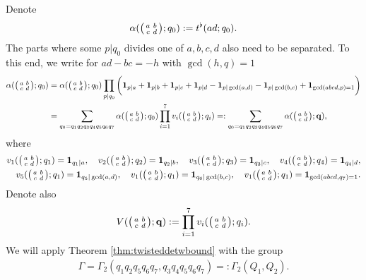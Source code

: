 \documentclass[12pt]{amsart}
\theoremstyle{definition}
\theoremstyle{remark}
\numberwithin{equation}{section}
\newcommand{\1}{{\mathbf 1}}
\renewcommand{\c}{\mathfrak c}
\begin{document}
Denote
\begin{align*}
    \alpha(\smqty(a & b \\c & d);q_0) := t^{\flat}(ad;q_0).
\end{align*}
The parts where some $p|q_0$ divides one of $a,b,c,d$ also need to be separated. To this end, we write for $ad-bc=-h$ with $\gcd(h,q)=1$
\begin{align}
  \nonumber   \alpha(\smqty(a & b \\c & d);q_0) &=  \alpha(\smqty(a & b \\c & d);q_0) \prod_{p|q_0} \bigg( \mathbf{1}_{p|a}+\mathbf{1}_{p|b} +  \mathbf{1}_{\substack{p|c  }}   + \mathbf{1}_{\substack{p |d  }} -\mathbf{1}_{p|\gcd(a,d)} -\mathbf{1}_{p|\gcd(b,c)}+ \mathbf{1}_{ \gcd(abcd,p)=1 }\bigg) \\
\label{eq:alphaqxdef}     &= \sum_{q_0=q_{1} q_{2} q_{3}q_{4}q_5 q_6 q_7}   \alpha(\smqty(a & b \\c & d);q_0) \prod_{i=1}^7 v_i(\smqty(a & b \\c & d);q_i)=: \sum_{q_0=q_{1} q_{2} q_{3}q_{4}q_5 q_6 q_7} \alpha(\smqty(a & b \\c & d);\mathbf{q}),
\end{align}
where
\begin{align*}
    v_1(\smqty(a & b \\c & d);q_1) = \mathbf{1}_{q_1|a}, \quad   v_2(\smqty(a & b \\c & d);q_2) = \mathbf{1}_{q_2|b},   \quad   v_3(\smqty(a & b \\c & d);q_3) = \mathbf{1}_{q_3|c},   \quad   v_4(\smqty(a & b \\c & d);q_4) = \mathbf{1}_{q_4|d},  \\
      v_5(\smqty(a & b \\c & d);q_1) = \mathbf{1}_{q_5|\gcd(a,d)}, \quad   v_1(\smqty(a & b \\c & d);q_1) = \mathbf{1}_{q_6|\gcd(b,c)}, \quad   v_1(\smqty(a & b \\c & d);q_1) = \mathbf{1}_{\gcd(abcd,q_7)=1}.
\end{align*}
Denote also
\begin{align*}
   V(\smqty(a & b \\c & d);\mathbf{q}) := \prod_{i=1}^7 v_i(\smqty(a & b \\c & d);q_i).
\end{align*}
We will apply Theorem \ref{thm:twisteddetwbound} with the group
\begin{align} \label{eq:Q1Q2def}
    \Gamma = \Gamma_2(q_1q_2 q_5 q_6 q_7,q_3q_4 q_5 q_6 q_7)=: \Gamma_2(Q_1,Q_2).
\end{align}
\end{document}
